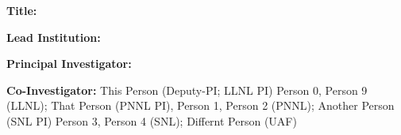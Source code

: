 \noindent
{\bf Title:} \Title

\vspace{0.5em}
\noindent
{\bf Lead Institution:} \Institute

\vspace{0.5em}
\noindent
{\bf Principal Investigator:} \Investigator


\vspace{0.5em}
\noindent
{\bf Co-Investigator:}  This Person (Deputy-PI; LLNL PI) Person 0, Person 9 (LLNL);
                        That Person (PNNL PI), Person 1, Person 2 (PNNL);
                        Another Person (SNL PI) Person 3, Person 4 (SNL);
                        Differnt Person (UAF)


\vspace{0.5em}
\noindent
\lipsum[1-4]

